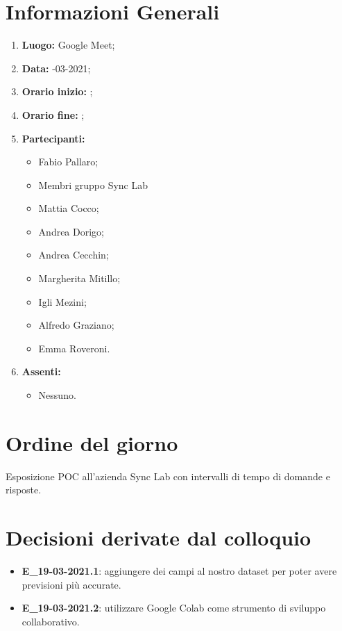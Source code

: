 \newpage
\section{Informazioni Generali}
\begin{enumerate}
	\item \textbf{Luogo:} \normalfont Google Meet;
	\item \textbf{Data:} -03-2021;
	\item \textbf{Orario inizio:} ;
	\item \textbf{Orario fine:} ;
	\item \textbf{Partecipanti:}
	\begin{itemize}
		\item Fabio Pallaro;
		\item Membri gruppo Sync Lab
		\item Mattia Cocco;
		\item Andrea Dorigo;
		\item Andrea Cecchin;
		\item Margherita Mitillo;
		\item Igli Mezini;
		\item Alfredo Graziano;
		\item Emma Roveroni.
	\end{itemize}
	\item \textbf{Assenti:}
	\begin{itemize}
		\item Nessuno.
	\end{itemize}
\end{enumerate}
\section{Ordine del giorno}
Esposizione POC all'azienda Sync Lab con intervalli di tempo di domande e risposte.

\section{Decisioni derivate dal colloquio}
\begin{itemize}
	\item \textbf{E\_19-03-2021.1}: aggiungere dei campi al nostro dataset per poter avere previsioni più accurate.
\end{itemize}
\begin{itemize}
	\item \textbf{E\_19-03-2021.2}: utilizzare Google Colab come strumento di sviluppo collaborativo.
\end{itemize}